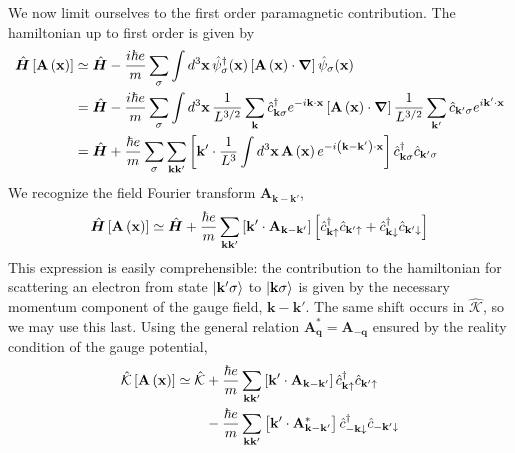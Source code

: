 We now limit ourselves to the first order paramagnetic contribution. The hamiltonian up to first order is given by
\[
\begin{aligned}
	\hat{\bm H} \left[{\mathbf{A}\left({\mathbf{x}}\right)}\right] &\simeq \hat{\bm H} - \frac{i\hbar e}{m} \sum_\sigma \int d^3 \mathbf{x} \, \hat{\psi}_\sigma^\dagger (\mathbf{x}) \left[{\mathbf{A}\left({\mathbf{x}}\right) \cdot\grad}\right] \hat{\psi}_\sigma (\mathbf{x}) \\
	&= \hat{\bm H} - \frac{i\hbar e}{m} \sum_\sigma \int d^3 \mathbf{x} \, \frac{1}{L^{3/2}} \sum_\mathbf{k}  \hat{c}_{\mathbf{k}\sigma}^\dagger e^{-i\mathbf{k} \cdot \mathbf{x}} \left[{\mathbf{A}\left({\mathbf{x}}\right) \cdot\grad }\right] \frac{1}{L^{3/2}} \sum_{\mathbf{k}'}  \hat{c}_{\mathbf{k}'\sigma} e^{i\mathbf{k}' \cdot \mathbf{x}} \\
	&= \hat{\bm H} + \frac{\hbar e}{m} \sum_\sigma \sum_{\mathbf{k} \mathbf{k}'} \left[{\mathbf{k}' \cdot \frac{1}{L^3} \int d^3 \mathbf{x} \, \mathbf{A}\left({\mathbf{x}}\right) e^{- i \left({\mathbf{k}-\mathbf{k}'}\right)\cdot \mathbf{x}} }\right] \hat{c}_{\mathbf{k}\sigma}^\dagger \hat{c}_{\mathbf{k}'\sigma}
\end{aligned}
\]
We recognize the field Fourier transform $\mathbf{A}_{\mathbf{k}-\mathbf{k}'}$,
\[
	\hat{\bm H} \left[{\mathbf{A}\left({\mathbf{x}}\right)}\right] \simeq \hat{\bm H} + \frac{\hbar e}{m} \sum_{\mathbf{k} \mathbf{k}'} \left[{\mathbf{k}' \cdot \mathbf{A}_{\mathbf{k}-\mathbf{k}'} }\right] \left[{\hat{c}_{\mathbf{k}\uparrow}^\dagger \hat{c}_{\mathbf{k}'\uparrow} + \hat{c}_{\mathbf{k}\downarrow}^\dagger \hat{c}_{\mathbf{k}'\downarrow}}\right]
\]
This expression is easily comprehensible: the contribution to the hamiltonian for scattering an electron from state $\ket{\mathbf{k}'\sigma}$ to $\ket{\mathbf{k}\sigma}$ is given by the necessary momentum component of the gauge field, $\mathbf{k}-\mathbf{k}'$. The same shift occurs in $\hat{\mathcal{K}}$, so we may use this last. Using the general relation $\mathbf{A}_\mathbf{q}^* = \mathbf{A}_{-\mathbf{q}}$ ensured by the reality condition of the gauge potential,
\[
\begin{aligned}
	\hat{\mathcal{K}} \left[{\mathbf{A}\left({\mathbf{x}}\right)}\right] \simeq \hat{\mathcal{K}} &+ \frac{\hbar e}{m} \sum_{\mathbf{k} \mathbf{k}'} \left[{\mathbf{k}' \cdot \mathbf{A}_{\mathbf{k}-\mathbf{k}'} }\right] \hat{c}_{\mathbf{k}\uparrow}^\dagger \hat{c}_{\mathbf{k}'\uparrow} \\
	&- \frac{\hbar e}{m} \sum_{\mathbf{k} \mathbf{k}'} \left[{\mathbf{k}' \cdot \mathbf{A}_{\mathbf{k}-\mathbf{k}'}^*}\right] \hat{c}_{-\mathbf{k}\downarrow}^\dagger \hat{c}_{-\mathbf{k}'\downarrow}
\end{aligned}
\]
